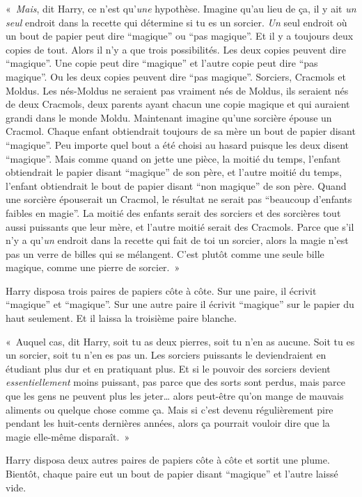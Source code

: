 «~\emph{Mais}, dit Harry, ce n'est qu'\emph{une} hypothèse.
Imagine qu'au lieu de ça, il y ait \emph{un seul} endroit dans la recette qui détermine si tu es un sorcier.
\emph{Un} seul endroit où un bout de papier peut dire “magique” ou “pas magique”.
Et il y a toujours deux copies de tout.
Alors il n'y a que trois possibilités.
Les deux copies peuvent dire “magique”.
Une copie peut dire “magique” et l'autre copie peut dire “pas magique”.
Ou les deux copies peuvent dire “pas magique”.
Sorciers, Cracmols et Moldus.
Les nés-Moldus ne seraient pas vraiment nés de Moldus, ils seraient nés de deux Cracmols, deux parents ayant chacun une copie magique et qui auraient grandi dans le monde Moldu.
Maintenant imagine qu'une sorcière épouse un Cracmol.
Chaque enfant obtiendrait toujours de sa mère un bout de papier disant “magique”.
Peu importe quel bout a été choisi au hasard puisque les deux disent “magique”.
Mais comme quand on jette une pièce, la moitié du temps, l'enfant obtiendrait le papier disant “magique” de son père, et l'autre moitié du temps, l'enfant obtiendrait le bout de papier disant “non magique” de son père.
Quand une sorcière épouserait un Cracmol, le résultat ne serait pas “beaucoup d'enfants faibles en magie”.
La moitié des enfants serait des sorciers et des sorcières tout aussi puissants que leur mère, et l'autre moitié serait des Cracmols.
Parce que s'il n'y a qu'\emph{un} endroit dans la recette qui fait de toi un sorcier, alors la magie n'est pas un verre de billes qui se mélangent.
C'est plutôt comme une seule bille magique, comme une pierre de sorcier.~»

Harry disposa trois paires de papiers côte à côte.
Sur une paire, il écrivit “magique” et “magique”.
Sur une autre paire il écrivit “magique” sur le papier du haut seulement.
Et il laissa la troisième paire blanche.

«~Auquel cas, dit Harry, soit tu as deux pierres, soit tu n'en as aucune.
Soit tu es un sorcier, soit tu n'en es pas un.
Les sorciers puissants le deviendraient en étudiant plus dur et en pratiquant plus.
Et si le pouvoir des sorciers devient \emph{essentiellement} moins puissant, pas parce que des sorts sont perdus, mais parce que les gens ne peuvent plus les jeter… alors peut-être qu'on mange de mauvais aliments ou quelque chose comme ça.
Mais si c'est devenu régulièrement pire pendant les huit-cents dernières années, alors ça pourrait vouloir dire que la magie elle-même disparaît.~»

Harry disposa deux autres paires de papiers côte à côte et sortit une plume.
Bientôt, chaque paire eut un bout de papier disant “magique” et l'autre laissé vide.

